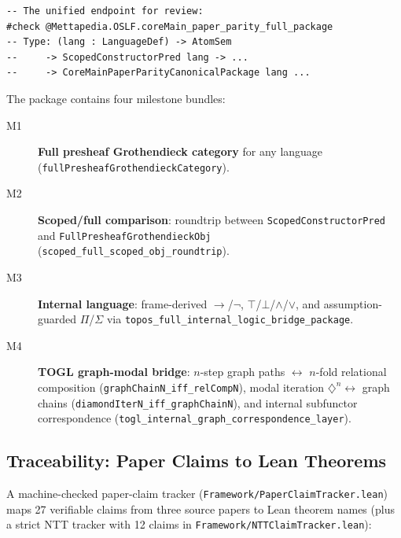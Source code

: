 \documentclass[]{article}
\newcommand{\code}[1]{\texttt{#1}}
\newcommand{\Dia}{\ensuremath{\diamondsuit}}
\begin{document}
\begin{lstlisting}[caption={Unified paper-parity package (CoreMain.lean)}]
-- The unified endpoint for review:
#check @Mettapedia.OSLF.coreMain_paper_parity_full_package
-- Type: (lang : LanguageDef) -> AtomSem
--     -> ScopedConstructorPred lang -> ...
--     -> CoreMainPaperParityCanonicalPackage lang ...
\end{lstlisting}

The package contains four milestone bundles:
\begin{description}
\item[M1] \textbf{Full presheaf Grothendieck category} for any language
  (\code{fullPresheafGrothendieckCategory}).
\item[M2] \textbf{Scoped/full comparison}: roundtrip between
  \code{ScopedConstructorPred} and \code{FullPresheafGrothendieckObj}
  (\code{scoped\_full\_scoped\_obj\_roundtrip}).
\item[M3] \textbf{Internal language}: frame-derived $\to$/$\lnot$,
  $\top$/$\bot$/$\land$/$\lor$, and assumption-guarded $\Pi$/$\Sigma$ via
  \code{topos\_full\_internal\_logic\_bridge\_package}.
\item[M4] \textbf{TOGL graph-modal bridge}: $n$-step graph paths $\leftrightarrow$
  $n$-fold relational composition (\code{graphChainN\_iff\_relCompN}), modal
  iteration $\Dia^n \leftrightarrow$ graph chains
  (\code{diamondIterN\_iff\_graphChainN}), and internal subfunctor correspondence
  (\code{togl\_internal\_graph\_correspondence\_layer}).
\end{description}

\subsection{Traceability: Paper Claims to Lean Theorems}

A machine-checked paper-claim tracker (\code{Framework/PaperClaimTracker.lean})
maps 27 verifiable claims from three source papers to Lean theorem names (plus a
strict NTT tracker with 12 claims in \code{Framework/NTTClaimTracker.lean}):
\end{document}
